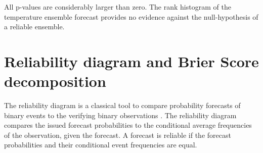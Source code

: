 \documentclass[article]{jss}\usepackage[]{graphicx}\usepackage[]{color}
\begin{document}
All p-values are considerably larger than zero.
The rank histogram of the temperature ensemble forecast provides no evidence against the null-hypothesis of a reliable ensemble.

\section{Reliability diagram and Brier Score decomposition}

The reliability diagram is a classical tool to compare probability forecasts of binary events to the verifying binary observations \citep{wilks2011statistical,jolliffe2012forecast}.
The reliability diagram compares the issued forecast probabilities to the conditional average frequencies of the observation, given the forecast.
A forecast is reliable if the forecast probabilities and their conditional event frequencies are equal.
\end{document}
